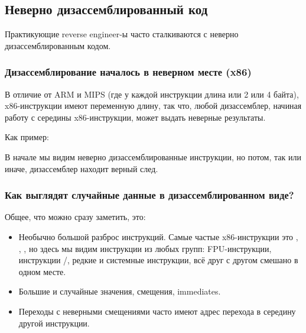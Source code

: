 \subsection{Неверно дизассемблированный код}
\label{sec:incorrectly_disasmed_code}

Практикующие reverse engineer-ы часто сталкиваются с неверно дизассемблированным кодом.

\subsubsection{Дизассемблирование началось в неверном месте (x86)}

В отличие от ARM и MIPS (где у каждой инструкции длина или 2 или 4 байта), x86-инструкции имеют переменную длину,
так что, любой дизассемблер, начиная работу с середины x86-инструкции, может выдать неверные результаты.

Как пример:



В начале мы видим неверно дизассемблированные инструкции, но потом, так или иначе, дизассемблер находит верный след.

\subsubsection{Как выглядят случайные данные в дизассемблированном виде?}

Общее, что можно сразу заметить, это:

\begin{itemize}
\item Необычно большой разброс инструкций.
Самые частые x86-инструкции это \PUSH{}, \MOV{}, \CALL{}, 
но здесь мы видим
инструкции из любых групп: \ac{FPU}-инструкции, инструкции /, редкие и системные инструкции, всё друг с другом смешано в одном месте.

\item Большие и случайные значения, смещения, immediates.

\item Переходы с неверными смещениями часто имеют адрес перехода в середину другой инструкции.
\end{itemize}



